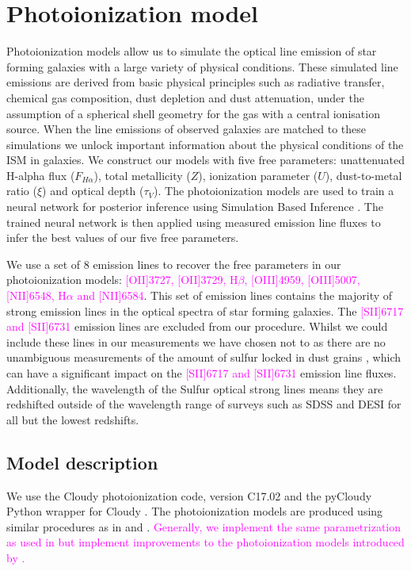 \documentclass[fleqn,usenatbib]{mnras}
\begin{document}
\section{Photoionization model}
\label{sec:photoionization_model}
Photoionization models allow us to simulate the optical line emission of star forming galaxies with a large variety of physical conditions. These simulated line emissions are derived from basic physical principles such as radiative transfer, chemical gas composition, dust depletion and dust attenuation, under the assumption of a spherical shell geometry for the gas with a central ionisation source. When the line emissions of observed galaxies are matched to these simulations we unlock important information about the physical conditions of the ISM in galaxies. We construct our models with five free parameters: unattenuated H-alpha flux ($F_{H\alpha}$), total metallicity ($Z$), ionization parameter ($U$), dust-to-metal ratio ($\xi$) and optical depth ($\tau_V$). The photoionization models are used to train a neural network for posterior inference using Simulation Based Inference \citep{tejero-cantero2020}. The trained neural network is then applied using measured emission line fluxes to infer the best values of our five free parameters.

We use a set of 8 emission lines to recover the free parameters in our photoionization models: \textcolor{magenta}{[OII]3727, [OII]3729, H$\beta$, [OIII]4959, [OIII]5007, [NII]6548, H$\alpha$ and [NII]6584}. This set of emission lines contains the majority of strong emission lines in the optical spectra of star forming galaxies. The \textcolor{magenta}{[SII]6717 and [SII]6731} emission lines are excluded from our procedure. Whilst we could include these lines in our measurements we have chosen not to as there are no unambiguous measurements of the amount of sulfur locked in dust grains \citep{jenkins2009}, which can have a significant impact on the \textcolor{magenta}{[SII]6717 and [SII]6731} emission line fluxes. Additionally, the wavelength of the Sulfur optical strong lines means they are redshifted outside of the wavelength range of surveys such as SDSS and DESI for all but the lowest redshifts. 

\subsection{Model description}
We use the Cloudy photoionization code, version C17.02 \citep{ferland2017} and the pyCloudy Python wrapper for Cloudy \citep{morisset2013}.  The photoionization models are produced using similar procedures as in \cite{charlot2001, brinchmann2013} and \cite{byler2017}. \textcolor{magenta}{Generally, we implement the same parametrization as used in \cite{brinchmann2013} but implement improvements to the photoionization models introduced by \cite{byler2017}.} 
\end{document}
